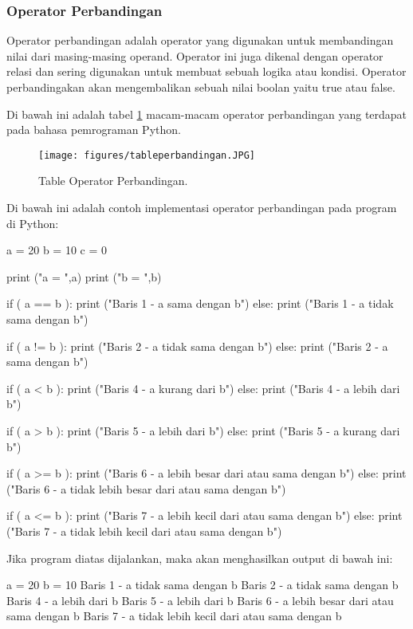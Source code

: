\subsubsection{Operator Perbandingan}
Operator perbandingan adalah operator yang digunakan untuk membandingan nilai dari masing-masing operand. Operator ini juga dikenal dengan operator relasi dan sering digunakan untuk membuat sebuah logika atau kondisi. Operator perbandingakan akan mengembalikan sebuah nilai boolan yaitu true atau false.

Di bawah ini adalah tabel \ref{tableperbandingan} macam-macam operator perbandingan yang terdapat pada bahasa pemrograman Python.
\begin{figure}[ht]
	\centerline{\texttt{[image: figures/tableperbandingan.JPG]}}
	\caption{Table Operator Perbandingan.}
	\label{tableperbandingan}
\end{figure}

Di bawah ini adalah contoh implementasi operator perbandingan pada program di Python:

a = 20
b = 10
c = 0

\begin{verbartim}
print ("a = ",a)
print ("b = ",b)

if ( a == b ):
   print ("Baris 1 - a sama dengan b")
else:
   print ("Baris 1 - a tidak sama dengan b")

if ( a != b ):
   print ("Baris 2 - a tidak sama dengan b")
else:
   print ("Baris 2 - a sama dengan b")

if ( a < b ):
   print ("Baris 4 - a kurang dari b") 
else:
   print ("Baris 4 - a lebih dari b")

if ( a > b ):
   print ("Baris 5 - a lebih dari b") 
else:
   print ("Baris 5 - a kurang dari b")

if ( a >= b ):
   print ("Baris 6 - a lebih besar dari atau sama dengan b") 
else:
   print ("Baris 6 - a tidak lebih besar dari atau sama dengan b") 

if ( a <= b ):
   print ("Baris 7 - a lebih kecil dari atau sama dengan b") 
else:
   print ("Baris 7 - a tidak lebih kecil dari atau sama dengan b")    
   
\end{verbartim}

Jika program diatas dijalankan, maka akan menghasilkan output di bawah ini:

a =  20
b =  10
Baris 1 - a tidak sama dengan b
Baris 2 - a tidak sama dengan b
Baris 4 - a lebih dari b
Baris 5 - a lebih dari b
Baris 6 - a lebih besar dari atau sama dengan b
Baris 7 - a tidak lebih kecil dari atau sama dengan b

